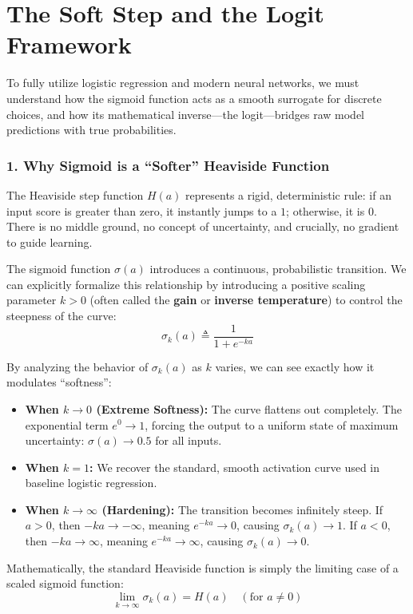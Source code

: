 \documentclass{article}
\begin{document}
\section*{The Soft Step and the Logit Framework}

To fully utilize logistic regression and modern neural networks, we must understand how the sigmoid function acts as a smooth surrogate for discrete choices, and how its mathematical inverse—the logit—bridges raw model predictions with true probabilities.

\subsubsection*{1. Why Sigmoid is a ``Softer'' Heaviside Function}
The Heaviside step function $H(a)$ represents a rigid, deterministic rule: if an input score is greater than zero, it instantly jumps to a $1$; otherwise, it is $0$. There is no middle ground, no concept of uncertainty, and crucially, no gradient to guide learning.

The sigmoid function $\sigma(a)$ introduces a continuous, probabilistic transition. We can explicitly formalize this relationship by introducing a positive scaling parameter $k > 0$ (often called the \textbf{gain} or \textbf{inverse temperature}) to control the steepness of the curve:
\begin{equation}
    \sigma_k(a) \triangleq \frac{1}{1 + e^{-ka}}
\end{equation}

By analyzing the behavior of $\sigma_k(a)$ as $k$ varies, we can see exactly how it modulates ``softness'':
\begin{itemize}
    \item \textbf{When $k \to 0$ (Extreme Softness):} The curve flattens out completely. The exponential term $e^0 \to 1$, forcing the output to a uniform state of maximum uncertainty: $\sigma(a) \to 0.5$ for all inputs.
    \item \textbf{When $k = 1$:} We recover the standard, smooth activation curve used in baseline logistic regression.
    \item \textbf{When $k \to \infty$ (Hardening):} The transition becomes infinitely steep. If $a > 0$, then $-ka \to -\infty$, meaning $e^{-ka} \to 0$, causing $\sigma_k(a) \to 1$. If $a < 0$, then $-ka \to \infty$, meaning $e^{-ka} \to \infty$, causing $\sigma_k(a) \to 0$. 
\end{itemize}

Mathematically, the standard Heaviside function is simply the limiting case of a scaled sigmoid function:
\begin{equation}
    \lim_{k \to \infty} \sigma_k(a) = H(a) \quad (\text{for } a \neq 0)
\end{equation}
\end{document}
